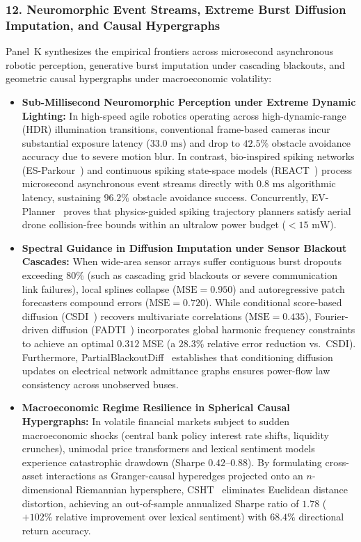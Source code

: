 \subsubsection{12. Neuromorphic Event Streams, Extreme Burst Diffusion Imputation, and Causal Hypergraphs}
Panel~K synthesizes the empirical frontiers across microsecond asynchronous robotic perception, generative burst imputation under cascading blackouts, and geometric causal hypergraphs under macroeconomic volatility:
\begin{itemize}
    \item \textbf{Sub-Millisecond Neuromorphic Perception under Extreme Dynamic Lighting:} In high-speed agile robotics operating across high-dynamic-range (HDR) illumination transitions, conventional frame-based cameras incur substantial exposure latency ($33.0\text{ ms}$) and drop to $42.5\%$ obstacle avoidance accuracy due to severe motion blur. In contrast, bio-inspired spiking networks (ES-Parkour~\cite{Zhang2025ESParkour}) and continuous spiking state-space models (REACT~\cite{Keime2026REACT}) process microsecond asynchronous event streams directly with $0.8\text{ ms}$ algorithmic latency, sustaining $96.2\%$ obstacle avoidance success. Concurrently, EV-Planner~\cite{Sanyal2023EVPlanner} proves that physics-guided spiking trajectory planners satisfy aerial drone collision-free bounds within an ultralow power budget ($<15\text{ mW}$).
    \item \textbf{Spectral Guidance in Diffusion Imputation under Sensor Blackout Cascades:} When wide-area sensor arrays suffer contiguous burst dropouts exceeding $80\%$ (such as cascading grid blackouts or severe communication link failures), local splines collapse ($\text{MSE} = 0.950$) and autoregressive patch forecasters compound errors ($\text{MSE} = 0.720$). While conditional score-based diffusion (CSDI~\cite{Tashiro2021CSDI}) recovers multivariate correlations ($\text{MSE} = 0.435$), Fourier-driven diffusion (FADTI~\cite{Li2025FADTI}) incorporates global harmonic frequency constraints to achieve an optimal $0.312$ MSE (a $28.3\%$ relative error reduction vs.\ CSDI). Furthermore, PartialBlackoutDiff~\cite{Islam2025PartialBlackout} establishes that conditioning diffusion updates on electrical network admittance graphs ensures power-flow law consistency across unobserved buses.
    \item \textbf{Macroeconomic Regime Resilience in Spherical Causal Hypergraphs:} In volatile financial markets subject to sudden macroeconomic shocks (central bank policy interest rate shifts, liquidity crunches), unimodal price transformers and lexical sentiment models experience catastrophic drawdown (Sharpe $0.42$--$0.88$). By formulating cross-asset interactions as Granger-causal hyperedges projected onto an $n$-dimensional Riemannian hypersphere, CSHT~\cite{Harit2025CSHT} eliminates Euclidean distance distortion, achieving an out-of-sample annualized Sharpe ratio of $1.78$ ($+102\%$ relative improvement over lexical sentiment) with $68.4\%$ directional return accuracy.
\end{itemize}

